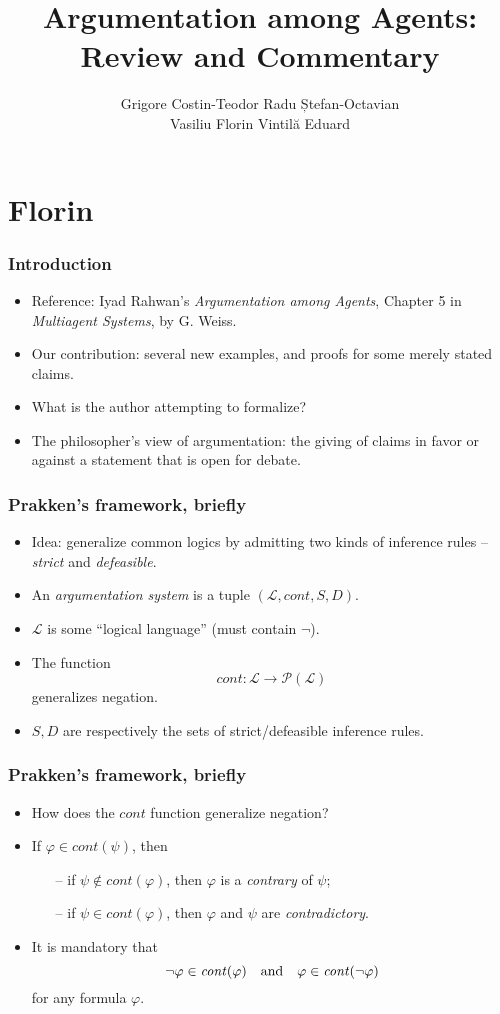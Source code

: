 \documentclass{beamer}
\title{Argumentation among Agents:\\Review and Commentary}
\author{Grigore Costin-Teodor \quad Radu Ștefan-Octavian \\ Vasiliu Florin \quad Vintilă Eduard}
\date{}
\begin{document}
\maketitle


\section{Florin}

\begin{frame}
\frametitle{Introduction}
\begin{itemize}
\item Reference: Iyad Rahwan's \emph{Argumentation among Agents}, Chapter 5 in \emph{Multiagent Systems}, by G. Weiss. \pause
\item Our contribution: several new examples, and proofs for some merely stated claims. \pause
\item What is the author attempting to formalize? \pause
\item The philosopher's view of argumentation: the giving of claims in favor or against a statement that is open for debate.
\end{itemize}
\end{frame}

\begin{frame}
\frametitle{Prakken's framework, briefly}
\begin{itemize}
\item Idea: generalize common logics by admitting two kinds of inference rules -- \emph{strict} and \emph{defeasible}. \pause
\item An \emph{argumentation system} is a tuple \( (\mathcal{L}, \mathit{cont}, S, D) \). \pause
\item $\mathcal{L}$ is some ``logical language'' (must contain $\neg$). \pause
\item The function \[ \mathit{cont} : \mathcal{L} \rightarrow \mathcal{P(L)} \] generalizes negation. \pause
\item $S, D$ are respectively the sets of strict/defeasible inference rules.
\end{itemize}
\end{frame}

\begin{frame}
\frametitle{Prakken's framework, briefly}
\begin{itemize}
\item How does the $\mathit{cont}$ function generalize negation? \pause
\item If \( \varphi \in \mathit{cont}(\psi) \), then
  \begin{itemize}
  \item[--] if \( \psi \not\in \mathit{cont}(\varphi) \), then $\varphi$ is a \emph{contrary} of $\psi$;
  \item[--] if \( \psi \in \mathit{cont}(\varphi) \), then $\varphi$ and $\psi$ are \emph{contradictory}.
  \end{itemize} \pause
\item It is mandatory that \[ \neg\varphi \in \mathit{cont}(\varphi) \mbox{\quad and\quad } \varphi \in \mathit{cont}(\neg\varphi) \] for any formula $\varphi$.
\end{itemize}
\end{frame}
\end{document}
